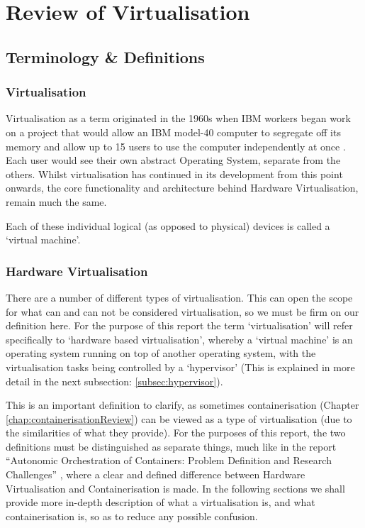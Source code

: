 
\chapter{Review of Virtualisation}
\label{chap:virtualisationReview}

\section{Terminology \& Definitions}


\subsection{Virtualisation}
Virtualisation as a term originated in the 1960s when IBM workers began work on a project that would allow an IBM model-40 computer to segregate off its memory and allow up to 15 users to use the computer independently at once \citep{Lindquist1966}. Each user would see their own abstract Operating System, separate from the others. Whilst virtualisation has continued in its development from this point onwards, the core functionality and architecture behind Hardware Virtualisation, remain much the same.

Each of these individual logical (as opposed to physical) devices is called a `virtual machine'.

\subsection{Hardware Virtualisation}
\label{subsec:HardwareVirtualisation}
There are a number of different types of virtualisation. This can open the scope for what can and can not be considered virtualisation, so we must be firm on our definition here. For the purpose of this report the term `virtualisation' will refer specifically to `hardware based virtualisation', whereby a `virtual machine' is an operating system running on top of another operating system, with the virtualisation tasks being controlled by a `hypervisor' (This is explained in more detail in the next subsection: \ref{subsec:hypervisor}).

This is an important definition to clarify, as sometimes containerisation (Chapter \ref{chap:containerisationReview}) can be viewed as a type of virtualisation (due to the similarities of what they provide). For the purposes of this report, the two definitions must be distinguished as separate things, much like in the report ``Autonomic Orchestration of Containers: Problem Definition and Research Challenges'' \citep{casalicchio2016}, where a clear and defined difference between Hardware Virtualisation and Containerisation is made. In the following sections we shall provide more in-depth description of what a virtualisation is, and what containerisation is, so as to reduce any possible confusion.

